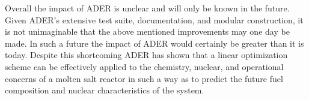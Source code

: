 Overall the impact of ADER is unclear and will only be known in the future.
Given ADER's extensive test suite, documentation, and modular construction, it
is not unimaginable that the above mentioned improvements may one day be made.
In such a future the impact of ADER would certainly be greater than it is today.
Despite this shortcoming ADER has shown that a linear optimization scheme can
be effectively applied to the chemistry, nuclear, and operational concerns of a
molten salt reactor in such a way as to predict the future fuel composition and 
nuclear characteristics of the system.
